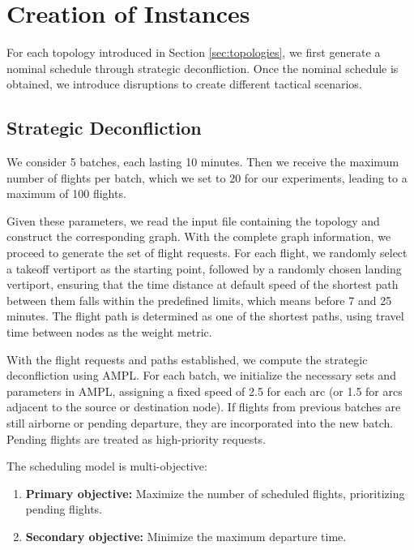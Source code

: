 \documentclass[../../thesis.tex]{subfiles}
\begin{document}
\section{Creation of Instances}\label{sec:generationInstance}

For each topology introduced in Section \ref{sec:topologies}, we first generate a nominal schedule through strategic deconfliction.  
Once the nominal schedule is obtained, we introduce disruptions to create different tactical scenarios.

\subsection{Strategic Deconfliction}

We consider 5 batches, each lasting 10 minutes.  
Then we receive the maximum number of flights per batch, which we set to 20 for our experiments, leading to a maximum of 100 flights.  

Given these parameters, we read the input file containing the topology and construct the corresponding graph.  
With the complete graph information, we proceed to generate the set of flight requests.  
For each flight, we randomly select a takeoff vertiport as the starting point, followed by a randomly chosen landing vertiport, ensuring that the time distance at default speed of the shortest path between them falls within the predefined limits, which means before 7 and 25 minutes.  
The flight path is determined as one of the shortest paths, using travel time between nodes as the weight metric.  

With the flight requests and paths established, we compute the strategic deconfliction using AMPL.  
For each batch, we initialize the necessary sets and parameters in AMPL, assigning a fixed speed of 2.5 for each arc (or 1.5 for arcs adjacent to the source or destination node).  
If flights from previous batches are still airborne or pending departure, they are incorporated into the new batch.  
Pending flights are treated as high-priority requests.  

The scheduling model is multi-objective:  
\begin{enumerate}
    \item \textbf{Primary objective:} Maximize the number of scheduled flights, prioritizing pending flights. 
    \item \textbf{Secondary objective:} Minimize the maximum departure time.  
\end{enumerate}
\end{document}
